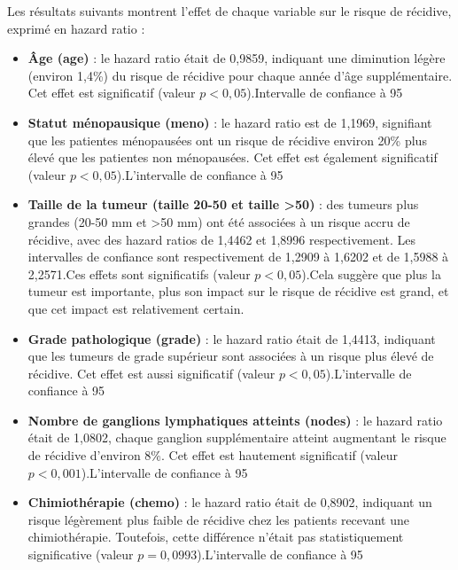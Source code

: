 \documentclass[../main.tex]{subfiles}
\begin{document}
\begin{CJK*}{UTF8}{gbsn}
Les résultats suivants montrent l'effet de chaque variable sur le risque de récidive, exprimé en hazard ratio :
\begin{itemize}
  \item \textbf{Âge (age)} : le hazard ratio était de 0,9859, indiquant une diminution légère (environ 1,4\%) du risque de récidive pour chaque année d'âge supplémentaire. Cet effet est significatif (valeur \( p < 0,05 \)).Intervalle de confiance à 95 %
  \item \textbf{Statut ménopausique (meno)} : le hazard ratio est de 1,1969, signifiant que les patientes ménopausées ont un risque de récidive environ 20\% plus élevé que les patientes non ménopausées. Cet effet est également significatif (valeur \( p < 0,05 \)).L'intervalle de confiance à 95 %
  \item \textbf{Taille de la tumeur (taille 20-50 et taille >50)} : des tumeurs plus grandes (20-50 mm et >50 mm) ont été associées à un risque accru de récidive, avec des hazard ratios de 1,4462 et 1,8996 respectivement. Les intervalles de confiance sont respectivement de 1,2909 à 1,6202 et de 1,5988 à 2,2571.Ces effets sont significatifs (valeur \( p < 0,05 \)).Cela suggère que plus la tumeur est importante, plus son impact sur le risque de récidive est grand, et que cet impact est relativement certain.
  \item \textbf{Grade pathologique (grade)} : le hazard ratio était de 1,4413, indiquant que les tumeurs de grade supérieur sont associées à un risque plus élevé de récidive. Cet effet est aussi significatif (valeur \( p < 0,05 \)).L'intervalle de confiance à 95 %
  \item \textbf{Nombre de ganglions lymphatiques atteints (nodes)} : le hazard ratio était de 1,0802, chaque ganglion supplémentaire atteint augmentant le risque de récidive d'environ 8\%. Cet effet est hautement significatif (valeur \( p < 0,001 \)).L'intervalle de confiance à 95 %
  \item \textbf{Chimiothérapie (chemo)} : le hazard ratio était de 0,8902, indiquant un risque légèrement plus faible de récidive chez les patients recevant une chimiothérapie. Toutefois, cette différence n'était pas statistiquement significative (valeur \( p = 0,0993 \)).L'intervalle de confiance à 95 %

\end{itemize}


\end{CJK*}
\end{document}
